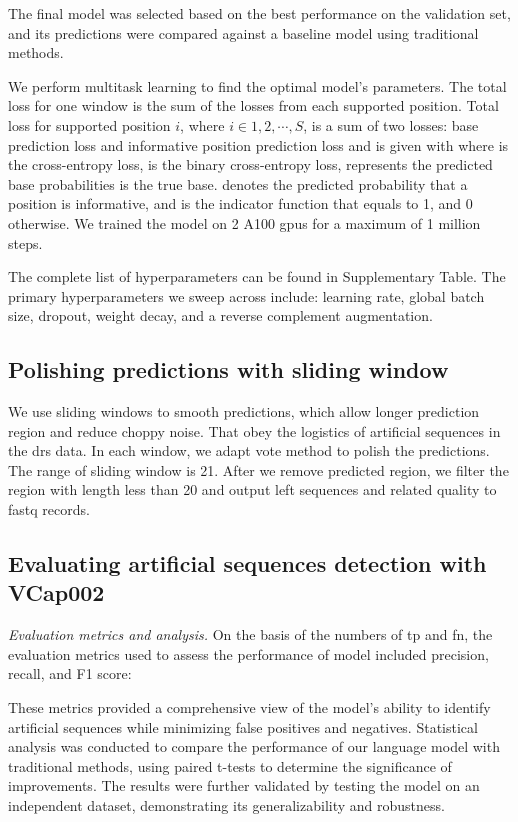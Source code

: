 \documentclass[pdflatex, sn-mathphys-num, lineno]{sn-jnl}%
\theoremstyle{thmstyleone}%
\theoremstyle{thmstyletwo}%
\theoremstyle{thmstylethree}%
\begin{document}
The final model was selected based on the best performance on the validation set, and its predictions were compared against a baseline model using traditional methods.

We perform multitask learning to find the optimal model's parameters.
The total loss for one window is the sum of the losses from each supported position.
Total loss for supported position  \( i \), where \( i  \in {1,2, \cdots, S} \), is a sum of two losses: base prediction loss and informative position prediction loss and is given with
where is the cross-entropy loss, is the binary cross-entropy loss, represents the predicted base probabilities is the true base.
denotes the predicted probability that a
position is informative, and is the indicator function that equals to 1, and 0 otherwise.
We trained the model on 2 A100 \glspl{gpu} for a maximum of 1 million steps.

The complete list of hyperparameters can be found in Supplementary Table.
The primary hyperparameters we sweep across include: learning rate, global batch size, dropout, weight decay, and a reverse complement augmentation.

\subsection{Polishing predictions with sliding window}

We use sliding windows to smooth predictions, which allow longer prediction region and reduce choppy noise.
That obey the logistics of artificial sequences in the \gls{drs} data.
In each window, we adapt vote method to polish the predictions.
The range of sliding window is \num{21}.
After we remove predicted region, we filter the region with length less than \num{20} and output left sequences and related quality to fastq records.

\subsection{Evaluating artificial sequences detection with VCap002}

\textit{Evaluation metrics and analysis.} On the basis of the numbers of \gls{tp} and \gls{fn}, the evaluation metrics used to assess the performance of  model included precision, recall, and F1 score:

These metrics provided a comprehensive view of the model's ability to identify artificial sequences while minimizing false positives and negatives.
Statistical analysis was conducted to compare the performance of our language model with traditional methods, using paired t-tests to determine the significance of improvements.
The results were further validated by testing the model on an independent dataset, demonstrating its generalizability and robustness.
\end{document}
